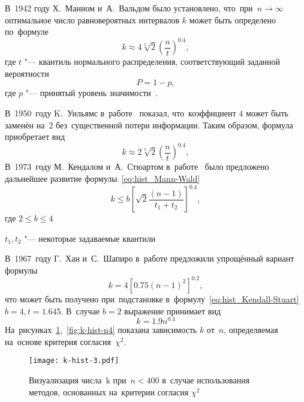 \documentclass[]{scrartcl}
\begin{document}
В~1942 году Х.~Манном и~А.~Вальдом было установлено, что~при~$n \longrightarrow \infty$ оптимальное число равновероятных интервалов $k$ может быть определено по~формуле
\begin{equation}\label{eq:hist_Mann-Wald}
k \approx 4 \sqrt[5]{2} (\frac{n}{t})^{0.4},
\end{equation}
где $t$ "--- квантиль нормального распределения, соответствующий заданной вероятности
\begin{equation}\label{eq:hist_Mann-Wald1}
P = 1 - p,
\end{equation}
где $p$ "--- принятый уровень значимости~\cite{Mann-Wald:Number-of-Class-Intervals}.

В~1950~году K.~Уильямс в~работе~\cite{Williams:choice-of-k} показал, что~коэффициент $4$ может быть заменён на~$2$ без~существенной потери информации. Таким образом, формула приобретает вид
\begin{equation}\label{eq:hist_Williams}
k \approx 2 \sqrt[5]{2} (\frac{n}{t})^{0.4},
\end{equation}
В~1973~году М.~Кендалом и~А.~Стюартом в~работе~\cite{Stat-vyvody-i-svyazi} было предложено дальнейшее развитие формулы~\ref{eq:hist_Mann-Wald}
\begin{equation}\label{eq:hist_Kendall-Stuart}
k \leq b [\sqrt{2}\frac{(n-1)}{t_{1}+t_{2}}]^{0.4},
\end{equation}
где $2 \leq b \leq 4$ 

$t_1, t_2$ "--- некоторые задаваемые квантили


В~1967~году Г.~Хан и~С.~Шапиро в~работе \cite{Hahn&Shapiro:StatModelEng} предложили упрощённый вариант формулы
\begin{equation}\label{eq:hist_Hahn-Shapiro}
k = 4 [0.75 (n-1)^2]^{0.2},
\end{equation}
что может быть получено при~подстановке в~формулу~\ref{eq:hist_Kendall-Stuart} $b = 4, t = 1.645$. В~случае $b = 2$ выражение принимает вид
\begin{equation}\label{eq:hist_Hahn&Shapiro2}
k = 1.9n^{0.4}
\end{equation}
На~рисунках~\ref{fig:k-hist-n3},~\ref{fig:k-hist-n4} показана зависимость $k$ от~$n$, определяемая на~основе критерия согласия~$\chi ^ 2$.
\begin{figure}[ht]
	\centering %
	\texttt{[image: k-hist-3.pdf]}
	\caption{Визуализация числа~k при~$n < 400$ в~случае использования методов, основанных на~критерии согласия $\chi^2$}\label{fig:k-hist-n3}
\end{figure}
\end{document}
